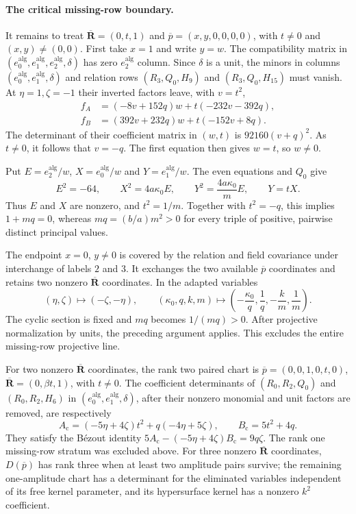 \documentclass[11pt,a4paper]{article}
\numberwithin{equation}{section}
\theoremstyle{plain}
\theoremstyle{definition}
\theoremstyle{remark}
\begin{document}
\paragraph{The critical missing-row boundary.}
It remains to treat
$\overline{\boldsymbol R}=(0,t,1)$ and
$\overline p=(x,y,0,0,0,0)$, with $t\ne0$ and $(x,y)\ne(0,0)$.
First take $x=1$ and write $y=w$. The compatibility matrix
in $(e_0^{\mathrm{alg}},e_1^{\mathrm{alg}},e_2^{\mathrm{alg}},\delta)$ has zero $e_2^{\mathrm{alg}}$ column. Since $\delta$
is a unit, the minors in columns $(e_0^{\mathrm{alg}},e_1^{\mathrm{alg}},\delta)$ and relation
rows $(R_3,Q_0,H_9)$ and $(R_3,Q_0,H_{15})$ must vanish.
At $\eta =1,\zeta =-1$ their inverted factors leave, with $v=t^2$,
\[
\begin{aligned}
 f_A&=(-8v+152q)w+t(-232v-392q),\\
 f_B&=(392v+232q)w+t(-152v+8q).
\end{aligned}
\]
The determinant of their coefficient matrix in $(w,t)$ is
$92160(v+q)^2$. As $t\ne0$, it follows that $v=-q$.
The first equation then gives $w=t$, so $w\ne0$.

Put $E=e_2^{\mathrm{alg}}/w$, $X=e_0^{\mathrm{alg}}/w$ and $Y=e_1^{\mathrm{alg}}/w$. The even
equations and $Q_0$ give
\[
 E^2=-64,\qquad X^2=4a\kappa_0 E,\qquad
 Y^2=\frac{4a\kappa_0 }{m}E,\qquad Y=tX .
\]
Thus $E$ and $X$ are nonzero, and $t^2=1/m$. Together with
$t^2=-q$, this implies $1+mq=0$, whereas
$mq=(b/a)m^2>0$ for every triple of positive, pairwise distinct principal values.

The endpoint $x=0$, $y\ne0$ is covered by the relation
and field covariance under interchange of labels $2$ and $3$.
It exchanges the two available $\overline p$ coordinates and retains
two nonzero $\overline{\boldsymbol R}$ coordinates. In the adapted variables
\[
 (\eta ,\zeta )\longmapsto(-\zeta ,-\eta ),\qquad
 (\kappa_0 ,q,k,m)\longmapsto
 \left(-\frac{\kappa_0}{q},\frac1q,-\frac km,\frac1m\right).
\]
The cyclic section is fixed and $mq$ becomes $1/(mq)>0$.
After projective normalization by units, the
preceding argument applies. This excludes the entire
missing-row projective line.

For two nonzero $\overline{\boldsymbol R}$ coordinates, the rank two paired
chart is $\overline p=(0,0,1,0,t,0)$,
$\overline{\boldsymbol R}=(0,\beta t,1)$, with $t\ne0$.
The coefficient determinants of $(R_0,R_2,Q_0)$ and $(R_0,R_2,H_6)$
in $(e_0^{\mathrm{alg}},e_1^{\mathrm{alg}},\delta)$, after their nonzero monomial and unit factors
are removed, are respectively
\[
 A_{\mathrm c}=(-5\eta+4\zeta)t^2+q(-4\eta+5\zeta),\qquad
 B_{\mathrm c}=5t^2+4q.
\]
They satisfy the B\'ezout identity
$5A_{\mathrm c}-(-5\eta+4\zeta)B_{\mathrm c}=9q\zeta$. The rank one missing-row stratum was excluded above. For three nonzero $\overline{\boldsymbol R}$ coordinates, $D(\overline p)$ has rank three when at least two amplitude pairs survive; the remaining one-amplitude chart has a determinant for the eliminated variables independent of its free kernel parameter, and its hypersurface kernel has a nonzero $k^2$ coefficient.
\end{document}
